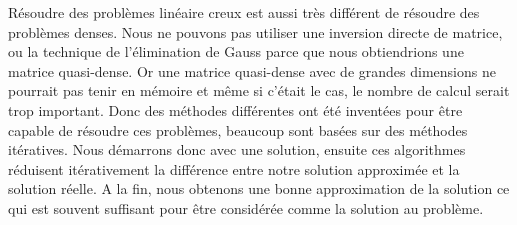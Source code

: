Résoudre des problèmes linéaire creux est aussi très différent de résoudre des problèmes denses.
%
Nous ne pouvons pas utiliser une inversion directe de matrice, ou la technique de l'élimination de Gauss parce que nous obtiendrions une matrice quasi-dense.
%
Or une matrice quasi-dense avec de grandes dimensions ne pourrait pas tenir en mémoire et même si c'était le cas, le nombre de calcul serait trop important.
%
Donc des méthodes différentes ont été inventées pour être capable de résoudre ces problèmes, beaucoup sont basées sur des méthodes itératives.
%
Nous démarrons donc avec une solution, ensuite ces algorithmes réduisent itérativement la différence entre notre solution approximée et la solution réelle.
%
A la fin, nous obtenons une bonne approximation de la solution ce qui est souvent suffisant pour être considérée comme la solution au problème.
